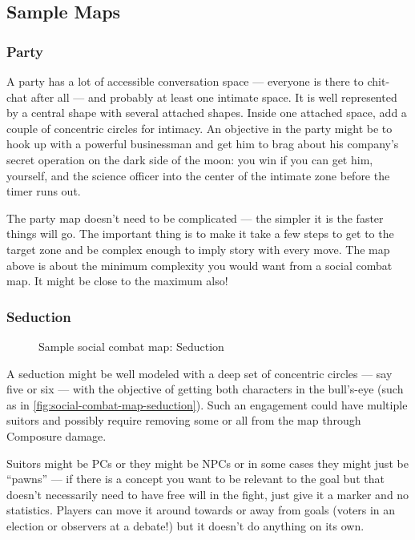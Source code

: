 \newpage

\subsection{Sample Maps}\label{sec:Sample Maps}


\subsubsection{Party}

A party has a lot of accessible conversation space --- everyone is there to chit-chat after all --- and probably at least one intimate space. It is well represented by a central shape with several attached shapes. Inside one attached space, add a couple of concentric circles for intimacy. An objective in the party might be to hook up with a powerful businessman and get him to brag about his company's secret operation on the dark side of the moon: you win if you can get him, yourself, and the science officer into the center of the intimate zone before the timer runs out.

The party map doesn't need to be complicated --- the simpler it is the faster things will go. The important thing is to make it take a few steps to get to the target zone and be complex enough to imply story with every move. The map above is about the minimum complexity you would want from a social combat map. It might be close to the maximum also!


\subsubsection{Seduction}

\begin{figure}
\centering\footnotesize

\caption{Sample social combat map: Seduction}
\label{fig:social-combat-map-seduction}
\end{figure}



A seduction might be well modeled with a deep set of concentric circles --- say five or six --- with the objective of getting both characters in the bull's-eye (such as in \autoref{fig:social-combat-map-seduction}). Such an engagement could have multiple suitors and possibly require removing some or all from the map through Composure damage.

Suitors might be PCs or they might be NPCs or in some cases they might just be ``pawns'' --- if there is a concept you want to be relevant to the goal but that doesn't necessarily need to have free will in the fight, just give it a marker and no statistics. Players can move it around towards or away from goals (voters in an election or observers at a debate!) but it doesn't do anything on its own.

